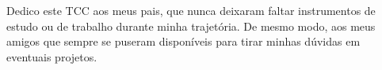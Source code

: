 \vfill
Dedico este TCC aos meus pais, que nunca deixaram faltar instrumentos de estudo ou de trabalho durante minha trajetória. De mesmo modo, aos meus amigos que sempre se puseram disponíveis para tirar minhas dúvidas em eventuais projetos.


